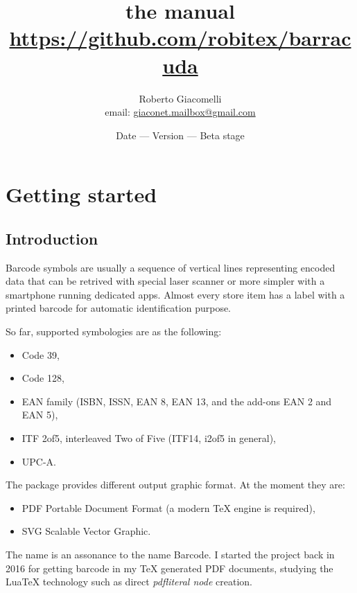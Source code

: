 \documentclass[11pt,a4paper]{article}
\author{Roberto Giacomelli\\\small email: \url{giaconet.mailbox@gmail.com}}
\title{the \code{barracuda} manual\\[1ex]
\small \url{https://github.com/robitex/barracuda}}
\date{\small Date \brcdkey{date} --- Version \brcdkey{version} --- Beta stage}
\begin{document}
\maketitle


\tableofcontents
\newpage


\section{Getting started}
\label{secStart}

\subsection{Introduction}
\label{secIntro}

Barcode symbols are usually a sequence of vertical lines representing encoded
data that can be retrived with special laser scanner or more simpler with a
smartphone running dedicated apps. Almost every store item has a label with a
printed barcode for automatic identification purpose.

So far, \brcd{} supported symbologies are as the following:
\begin{itemize}
\item Code 39,
\item Code 128,
\item EAN family (ISBN, ISSN, EAN 8, EAN 13, and the add-ons EAN 2 and EAN 5),
\item ITF 2of5, interleaved Two of Five (ITF14, i2of5 in general),
\item UPC-A.
\end{itemize}

The package provides different output graphic format. At the moment they are:
\begin{itemize}
\item PDF Portable Document Format (a modern \TeX{} engine is required),
\item SVG Scalable Vector Graphic.
\end{itemize}

The name \brcd{} is an assonance to the name Barcode. I started the project back
in 2016 for getting barcode in my \TeX{} generated PDF documents, studying the
Lua\TeX{} technology such as direct \emph{pdfliteral node} creation.
\end{document}
